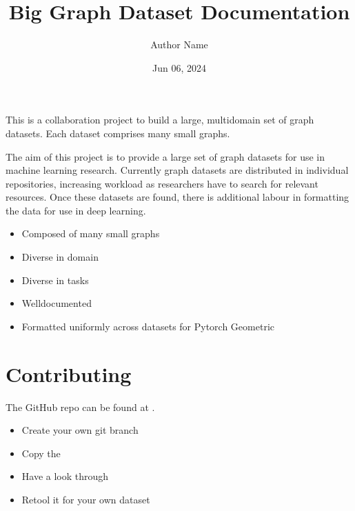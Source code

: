 \documentclass[letterpaper,10pt,english]{sphinxhowto}
\title{Big Graph Dataset Documentation}
\date{Jun 06, 2024}
\author{Author Name}
\begin{document}
\pagestyle{empty}
\sphinxmaketitle
\pagestyle{plain}
\sphinxtableofcontents
\pagestyle{normal}
\label{\detokenize{index::doc}}


\sphinxAtStartPar
This is a collaboration project to build a large, multi\sphinxhyphen{}domain set of graph datasets.
Each dataset comprises many small graphs.

\sphinxAtStartPar
The aim of this project is to provide a large set of graph datasets for use in machine learning research.
Currently graph datasets are distributed in individual repositories, increasing workload as researchers have to search for relevant resources.
Once these datasets are found, there is additional labour in formatting the data for use in deep learning.
\begin{description}
\begin{itemize}
\item {} 
\sphinxAtStartPar
Composed of many small graphs

\item {} 
\sphinxAtStartPar
Diverse in domain

\item {} 
\sphinxAtStartPar
Diverse in tasks

\item {} 
\sphinxAtStartPar
Well\sphinxhyphen{}documented

\item {} 
\sphinxAtStartPar
Formatted uniformly across datasets for Pytorch Geometric

\end{itemize}

\end{description}


\section{Contributing}
\label{\detokenize{index:contributing}}
\sphinxAtStartPar
The GitHub repo can be found at .
\begin{description}
\begin{itemize}
\item {} 
\sphinxAtStartPar
Create your own git branch

\item {} 
\sphinxAtStartPar
Copy the 

\item {} 
\sphinxAtStartPar
Have a look through

\item {} 
\sphinxAtStartPar
Re\sphinxhyphen{}tool it for your own dataset

\end{itemize}

\end{description}
\end{document}
